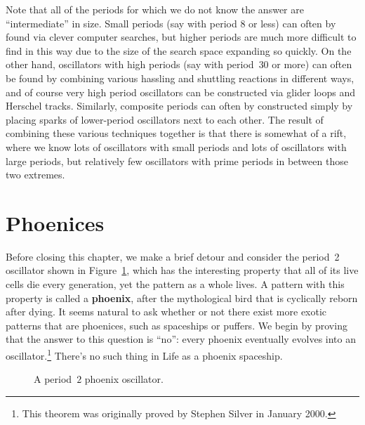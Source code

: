 Note that all of the periods for which we do not know the answer are ``intermediate'' in size. Small periods (say with period $8$ or less) can often by found via clever computer searches, but higher periods are much more difficult to find in this way due to the size of the search space expanding so quickly. On the other hand, oscillators with high periods (say with period~$30$ or more) can often be found by combining various hassling and shuttling reactions in different ways, and of course very high period oscillators can be constructed via glider loops and Herschel tracks. Similarly, composite periods can often by constructed simply by placing sparks of lower-period oscillators next to each other. The result of combining these various techniques together is that there is somewhat of a rift, where we know lots of oscillators with small periods and lots of oscillators with large periods, but relatively few oscillators with prime periods in between those two extremes.


\section{Phoenices}

Before closing this chapter, we make a brief detour and consider the period~2 oscillator shown in Figure~\ref{fig:phoenix}, which has the interesting property that all of its live cells die every generation, yet the pattern as a whole lives. A pattern with this property is called a \textbf{phoenix}, after the mythological bird that is cyclically reborn after dying. It seems natural to ask whether or not there exist more exotic patterns that are phoenices, such as spaceships or puffers. We begin by proving that the answer to this question is ``no'': every phoenix eventually evolves into an oscillator.\footnote{This theorem was originally proved by Stephen Silver in January 2000.} There's no such thing in Life as a phoenix spaceship.

\begin{figure}[!htb]
	\centering
	\caption{A period~$2$ phoenix oscillator.}\label{fig:phoenix}
\end{figure}

